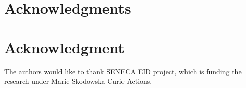 \documentclass[conference,compsoc]{IEEEtran}
\begin{document}











\ifCLASSOPTIONcompsoc
  \section*{Acknowledgments}
\else
  \section*{Acknowledgment}
\fi


The authors would like to thank SENECA EID project, which
is funding the research under Marie-Skodowska Curie Actions.






\end{document}
